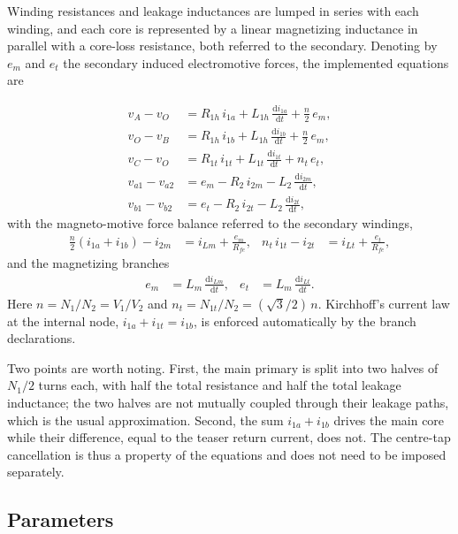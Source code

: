 Winding resistances and leakage inductances are lumped in series with each
winding, and each core is represented by a linear magnetizing inductance in
parallel with a core-loss resistance, both referred to the secondary. Denoting
by $e_m$ and $e_t$ the secondary induced electromotive forces, the implemented
equations are

\begin{align}
v_A - v_O &= R_{1h}\,i_{1a} + L_{1h}\,\frac{\mathrm{d}i_{1a}}{\mathrm{d}t}
             + \frac{n}{2}\,e_m ,\\[2pt]
v_O - v_B &= R_{1h}\,i_{1b} + L_{1h}\,\frac{\mathrm{d}i_{1b}}{\mathrm{d}t}
             + \frac{n}{2}\,e_m ,\\[2pt]
v_C - v_O &= R_{1t}\,i_{1t} + L_{1t}\,\frac{\mathrm{d}i_{1t}}{\mathrm{d}t}
             + n_t\,e_t ,\\[2pt]
v_{a1} - v_{a2} &= e_m - R_2\,i_{2m}
             - L_2\,\frac{\mathrm{d}i_{2m}}{\mathrm{d}t} ,\\[2pt]
v_{b1} - v_{b2} &= e_t - R_2\,i_{2t}
             - L_2\,\frac{\mathrm{d}i_{2t}}{\mathrm{d}t} ,
\end{align}
with the magneto-motive force balance referred to the secondary windings,
\begin{align}
\frac{n}{2}\left(i_{1a} + i_{1b}\right) - i_{2m}
   &= i_{Lm} + \frac{e_m}{R_{fe}} , &
n_t\,i_{1t} - i_{2t} &= i_{Lt} + \frac{e_t}{R_{fe}} ,
\end{align}
and the magnetizing branches
\begin{align}
e_m &= L_m\,\frac{\mathrm{d}i_{Lm}}{\mathrm{d}t} , &
e_t &= L_m\,\frac{\mathrm{d}i_{Lt}}{\mathrm{d}t} .
\end{align}
Here $n = N_1/N_2 = V_1/V_2$ and $n_t = N_{1t}/N_2 = (\sqrt{3}/2)\,n$.
Kirchhoff's current law at the internal node,
$i_{1a} + i_{1t} = i_{1b}$, is enforced automatically by the branch
declarations.

Two points are worth noting. First, the main primary is split into two halves
of $N_1/2$ turns each, with half the total resistance and half the total
leakage inductance; the two halves are not mutually coupled through their
leakage paths, which is the usual approximation. Second, the sum
$i_{1a}+i_{1b}$ drives the main core while their difference, equal to the
teaser return current, does not. The centre-tap cancellation is thus a property
of the equations and does not need to be imposed separately.

\subsection{Parameters}

